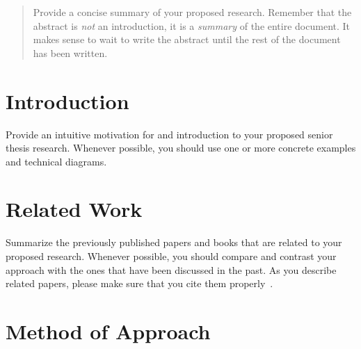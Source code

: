 \documentclass[11pt]{article}
\begin{document}

\begin{quote}

  Provide a concise summary of your proposed research. Remember that the abstract
  is {\it not\/} an introduction, it is a {\it summary\/} of the entire document.
  It makes sense to wait to write the abstract until the rest of the document has
  been written.

\end{quote}

\section{Introduction}
\label{sec:introduction}


Provide an intuitive motivation for and introduction to your proposed senior
thesis research. Whenever possible, you should use one or more concrete examples
and technical diagrams.

\section{Related Work}
\label{sec:relatedwork}


Summarize the previously published papers and books that are related to your
proposed research. Whenever possible, you should compare and contrast your
approach with the ones that have been discussed in the past. As you describe
related papers, please make sure that you cite them
properly~\cite{conrad-gecco-selection-study}.

\section{Method of Approach}
\label{sec:method}
\end{document}
